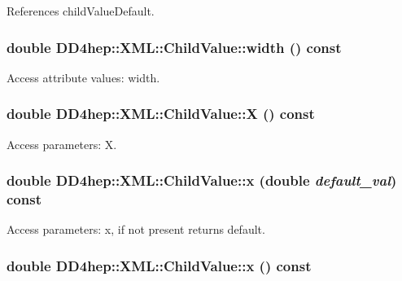 References childValueDefault.\hypertarget{struct_d_d4hep_1_1_x_m_l_1_1_child_value_a54e4d943f363b30d71d263480f615cc7}{
\subsubsection[{width}]{\setlength{\rightskip}{0pt plus 5cm}double DD4hep::XML::ChildValue::width () const}}
\label{struct_d_d4hep_1_1_x_m_l_1_1_child_value_a54e4d943f363b30d71d263480f615cc7}


Access attribute values: width. \hypertarget{struct_d_d4hep_1_1_x_m_l_1_1_child_value_a350863cb3ef1e42b1c16d01fa5f759d5}{
\subsubsection[{X}]{\setlength{\rightskip}{0pt plus 5cm}double DD4hep::XML::ChildValue::X () const}}
\label{struct_d_d4hep_1_1_x_m_l_1_1_child_value_a350863cb3ef1e42b1c16d01fa5f759d5}


Access parameters: X. \hypertarget{struct_d_d4hep_1_1_x_m_l_1_1_child_value_a4b6d098ee81d240d5a12671d8de50e76}{
\subsubsection[{x}]{\setlength{\rightskip}{0pt plus 5cm}double DD4hep::XML::ChildValue::x (double {\em default\_\-val}) const}}
\label{struct_d_d4hep_1_1_x_m_l_1_1_child_value_a4b6d098ee81d240d5a12671d8de50e76}


Access parameters: x, if not present returns default. \hypertarget{struct_d_d4hep_1_1_x_m_l_1_1_child_value_a28563173370d2f75b35591a60e37bb0b}{
\subsubsection[{x}]{\setlength{\rightskip}{0pt plus 5cm}double DD4hep::XML::ChildValue::x () const}}
\label{struct_d_d4hep_1_1_x_m_l_1_1_child_value_a28563173370d2f75b35591a60e37bb0b}


